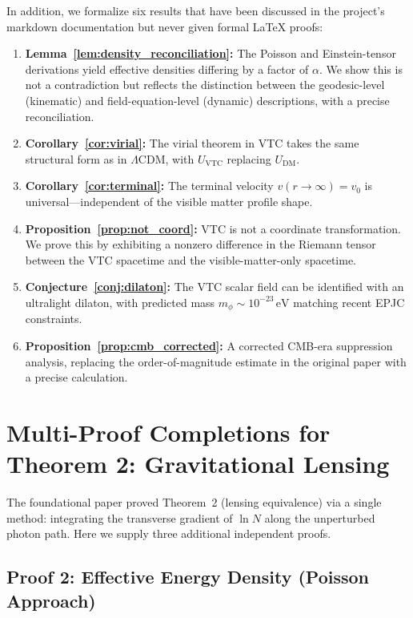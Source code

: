 \documentclass[11pt,a4paper]{article}
\theoremstyle{definition}
\newcommand{\DM}{\mathrm{DM}}
\newcommand{\VTC}{\mathrm{VTC}}
\begin{document}
In addition, we formalize six results that have been discussed in the project's markdown documentation but never given formal LaTeX proofs:

\begin{enumerate}
    \item \textbf{Lemma~\ref{lem:density_reconciliation}:} The Poisson and Einstein-tensor derivations yield effective densities differing by a factor of $\alpha$. We show this is not a contradiction but reflects the distinction between the geodesic-level (kinematic) and field-equation-level (dynamic) descriptions, with a precise reconciliation.
    \item \textbf{Corollary~\ref{cor:virial}:} The virial theorem in VTC takes the same structural form as in $\Lambda$CDM, with $U_{\VTC}$ replacing $U_{\DM}$.
    \item \textbf{Corollary~\ref{cor:terminal}:} The terminal velocity $v(r\to\infty) = v_0$ is universal---independent of the visible matter profile shape.
    \item \textbf{Proposition~\ref{prop:not_coord}:} VTC is not a coordinate transformation. We prove this by exhibiting a nonzero difference in the Riemann tensor between the VTC spacetime and the visible-matter-only spacetime.
    \item \textbf{Conjecture~\ref{conj:dilaton}:} The VTC scalar field can be identified with an ultralight dilaton, with predicted mass $m_\phi \sim 10^{-23}\,\mathrm{eV}$ matching recent EPJC constraints.
    \item \textbf{Proposition~\ref{prop:cmb_corrected}:} A corrected CMB-era suppression analysis, replacing the order-of-magnitude estimate in the original paper with a precise calculation.
\end{enumerate}

\section{Multi-Proof Completions for Theorem 2: Gravitational Lensing}
\label{sec:thm2_proofs}

The foundational paper proved Theorem~2 (lensing equivalence) via a single method: integrating the transverse gradient of $\ln N$ along the unperturbed photon path. Here we supply three additional independent proofs.

\subsection{Proof 2: Effective Energy Density (Poisson Approach)}
\label{sec:thm2_poisson}
\end{document}
